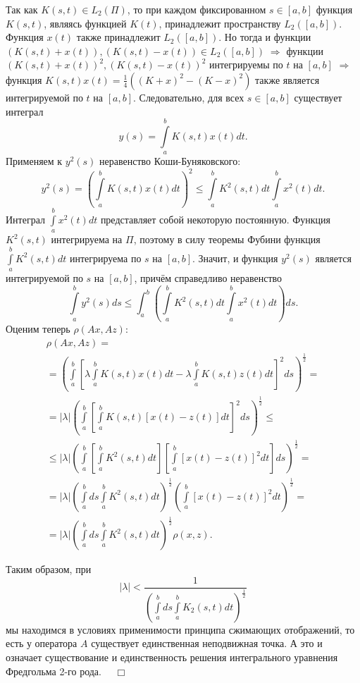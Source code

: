 \documentclass[12pt,a4paper, titlepage]{article}
\begin{document}
Так как $K(s, t) \in L_2(\Pi)$, то при каждом фиксированном $s \in [a, b]$ функция $K(s, t)$, являясь функцией $K(t)$, принадлежит пространству $L_2([a, b])$. Функция $x(t)$ также принадлежит $L_2([a, b])$. Но тогда и функции $(K(s, t) + x(t)), (K(s, t) - x(t)) \in L_2([a, b]) \; \Rightarrow$ функции $(K(s, t) + x(t))^2, (K(s, t) - x(t))^2$ интегрируемы по $t$ на $[a, b]$ $\Rightarrow$ функция $K(s, t) x(t) = \frac 1 4 \left( (K + x)^2 - (K - x)^2 \right)$ также является интегрируемой по $t$ на $[a, b]$. Следовательно, для всех $s \in [a, b]$ существует интеграл
$$
y(s) = \int\limits_a^b K(s,t) x(t) dt.
$$
Применяем к $y^2(s)$ неравенство Коши-Буняковского:
$$
y^2(s) = \left( \int\limits_a^b K(s,t) x(t) dt \right)^2 \leqslant \int\limits_a^b K^2(s,t) dt \int\limits_a^b x^2(t) dt.
$$
Интеграл $\int\limits_a^b x^2(t) dt$ представляет собой некоторую постоянную. Функция $K^2(s ,t)$ интегрируема на $\Pi$, поэтому в силу теоремы Фубини функция $\int\limits_a^b K^2(s,t) dt$ интегрируема по $s$ на $[a, b]$. Значит, и функция $y^2(s)$ является интегрируемой по $s$ на $[a, b]$, причём справедливо неравенство
$$
\int\limits_a^b y^2(s) ds \leqslant \int_a^b \left( \int\limits_a^b K^2(s,t) dt \int\limits_a^b x^2(t) dt \right) ds.
$$
Оценим теперь $\rho(Ax, Az)$:
\begin{multline*}
\rho(Ax, Az) = \\
= \left( \int\limits_a^b\left[ \lambda \int\limits_a^b K(s,t) x(t)dt - \lambda \int\limits_a^b K(s,t)z(t)dt \right]^2 ds \right)^{\frac 1 2} = \\
= |\lambda| \left( \int\limits_a^b \left[ \int\limits_a^b K(s,t) [x(t) - z(t)] dt \right]^2ds \right)^{\frac 1 2} \leqslant \\
\leqslant |\lambda|\left( \int\limits_a^b \left[ \int\limits_a^b K^2(s,t)dt \right] \left[ \int\limits_a^b[x(t)-z(t)]^2dt \right] ds \right)^{\frac 1 2} = \\
=|\lambda|\left( \int\limits_a^b ds \int\limits_a^b K^2(s,t)dt \right)^{\frac 1 2} \left( \int\limits_a^b[x(t)-z(t)]^2dt \right)^{\frac 1 2} = \\
= |\lambda|\left( \int\limits_a^b ds \int\limits_a^b K^2(s,t)dt\right)^{\frac 1 2} \rho(x,z).
\end{multline*}

Таким образом, при
$$
|\lambda| < \frac 1 {\left(\int\limits_a^b ds \int\limits_a^b K_2(s,t)dt\right)^{\frac 1 2}} 
$$
мы находимся в условиях применимости принципа сжимающих отображений, то есть у оператора $A$ существует единственная неподвижная точка. А это и означает существование и единственность решения интегрального уравнения Фредгольма 2-го рода. $\quad \Box$\\
\end{document}
